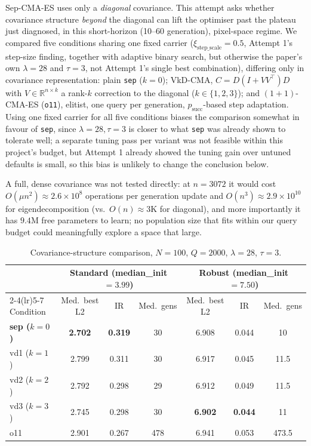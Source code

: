 \documentclass[11pt, a4paper]{article}
\begin{document}
Sep-CMA-ES uses only a \emph{diagonal} covariance. This attempt asks whether covariance structure \emph{beyond} the diagonal can lift the optimiser past the plateau just diagnosed, in this short-horizon (10--60 generation), pixel-space regime. We compared five conditions sharing one fixed carrier ($\xi_{\text{step\_scale}}=0.5$, Attempt 1's step-size finding, together with adaptive binary search, but otherwise the paper's own $\lambda=28$ and $\tau=3$, not Attempt 1's single best combination), differing only in covariance representation: plain \texttt{sep} ($k{=}0$); VkD-CMA, $C=D(I+VV^\top)D$ with $V\in\mathbb{R}^{n\times k}$ a rank-$k$ correction to the diagonal ($k\in\{1,2,3\}$); and $(1{+}1)$-CMA-ES (\texttt{o11}), elitist, one query per generation, $p_{\text{succ}}$-based step adaptation. Using one fixed carrier for all five conditions biases the comparison somewhat in favour of \texttt{sep}, since $\lambda=28,\tau=3$ is closer to what \texttt{sep} was already shown to tolerate well; a separate tuning pass per variant was not feasible within this project's budget, but Attempt 1 already showed the tuning gain over untuned defaults is small, so this bias is unlikely to change the conclusion below.

A full, dense covariance was not tested directly: at $n=3072$ it would cost $O(\mu n^2)\approx2.6\times10^8$ operations per generation update and $O(n^3)\approx2.9\times10^{10}$ for eigendecomposition (vs.\ $O(n)\approx3$K for diagonal), and more importantly it has $9.4$M free parameters to learn; no population size that fits within our query budget could meaningfully explore a space that large.

\begin{table}[htbp]
\centering
\caption{Covariance-structure comparison, $N=100$, $Q=2000$, $\lambda=28$, $\tau=3$.}
\label{tab:ec1}
\begin{tabular}{lcccccc}
\toprule
 & \multicolumn{3}{c}{Standard (median\_init $=3.99$)} & \multicolumn{3}{c}{Robust (median\_init $=7.50$)} \\
\cmidrule(lr){2-4}\cmidrule(lr){5-7}
Condition & Med.\ best L2 & IR & Med.\ gens & Med.\ best L2 & IR & Med.\ gens \\
\midrule
\textbf{sep ($k{=}0$)} & \textbf{2.702} & \textbf{0.319} & 30 & 6.908 & 0.044 & 10 \\
vd1 ($k{=}1$) & 2.799 & 0.311 & 30 & 6.917 & 0.045 & 11.5 \\
vd2 ($k{=}2$) & 2.792 & 0.298 & 29 & 6.912 & 0.049 & 11.5 \\
vd3 ($k{=}3$) & 2.745 & 0.298 & 30 & \textbf{6.902} & \textbf{0.044} & 11 \\
o11            & 2.901 & 0.267 & 478 & 6.941 & 0.053 & 473.5 \\
\bottomrule
\end{tabular}
\end{table}
\end{document}
